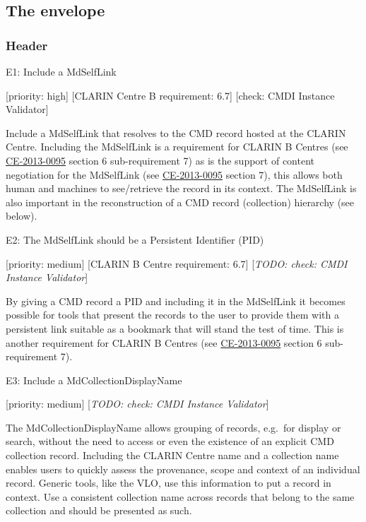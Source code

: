 \documentclass[]{article}
\date{}
\begin{document}
\subsection{The envelope}\label{the-envelope}

\subsubsection{Header}\label{header}

E1: Include a MdSelfLink

{[}priority: high{]} {[}CLARIN Centre B requirement: 6.7{]} {[}check:
CMDI Instance Validator{]}

Include a MdSelfLink that resolves to the CMD record hosted at the
CLARIN Centre. Including the MdSelfLink is a requirement for CLARIN B
Centres (see
\href{http://hdl.handle.net/1839/00-DOCS.CLARIN.EU-78}{CE-2013-0095}
section 6 sub-requirement 7) as is the support of content negotiation
for the MdSelfLink (see
\href{http://hdl.handle.net/1839/00-DOCS.CLARIN.EU-78}{CE-2013-0095}
section 7), this allows both human and machines to see/retrieve the
record in its context. The MdSelfLink is also important in the
reconstruction of a CMD record (collection) hierarchy (see below).

E2: The MdSelfLink should be a Persistent Identifier (PID)

{[}priority: medium{]} {[}CLARIN B Centre requirement: 6.7{]}
{[}\emph{TODO: check: CMDI Instance Validator}{]}

By giving a CMD record a PID and including it in the MdSelfLink it
becomes possible for tools that present the records to the user to
provide them with a persistent link suitable as a bookmark that will
stand the test of time. This is another requirement for CLARIN B Centres
(see
\href{http://hdl.handle.net/1839/00-DOCS.CLARIN.EU-78}{CE-2013-0095}
section 6 sub-requirement 7).

E3: Include a MdCollectionDisplayName

{[}priority: medium{]} {[}\emph{TODO: check: CMDI Instance Validator}{]}

The MdCollectionDisplayName allows grouping of records, e.g.~for display
or search, without the need to access or even the existence of an
explicit CMD collection record. Including the CLARIN Centre name and a
collection name enables users to quickly assess the provenance, scope
and context of an individual record. Generic tools, like the VLO, use
this information to put a record in context. Use a consistent collection
name across records that belong to the same collection and should be
presented as such.
\end{document}

